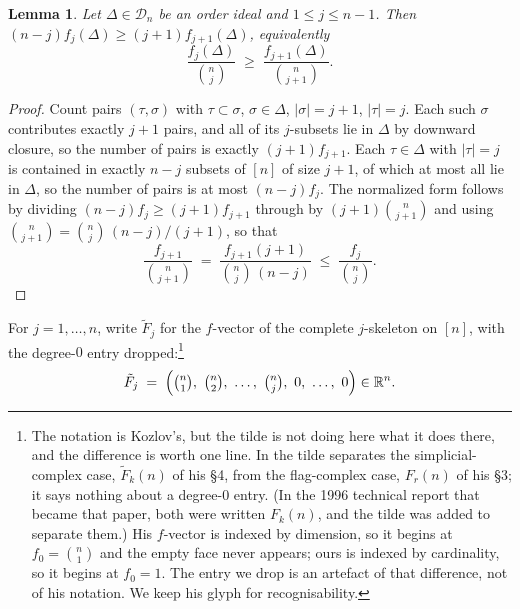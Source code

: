 \documentclass[11pt, a4paper, abstract=yes]{scrartcl}
\theoremstyle{definition}
\theoremstyle{remark}
\theoremstyle{plain}
\newtheorem{lemma}[definition]{Lemma}
\newcommand{\leandiscof}[1]{\tikz[baseline=-0.6ex]\fill[#1] (0,0) circle (0.6ex);}
\newcommand{\leanfull}{\leandiscof{leanfull}}
\newcommand{\leanmark}[1]{\leavevmode{\reversemarginpar\marginnote{\raggedleft#1}}}
\begin{document}
\begin{lemma}
\leanmark{\leanfull}Let \(\Delta\in\mathcal D_n\) be an order ideal and \(1\le j\le n-1\). Then
\((n-j)f_j(\Delta)\ge(j+1)f_{j+1}(\Delta)\), equivalently
\begin{equation}\label{eq:lym}
  \frac{f_j(\Delta)}{\binom nj}\;\ge\;\frac{f_{j+1}(\Delta)}{\binom n{j+1}}.
\end{equation}
\label{lem:lym}
\label{lem-lym}
\end{lemma}

\begin{proof}
Count pairs \((\tau,\sigma)\) with \(\tau\subset\sigma\), \(\sigma\in\Delta\), \(|\sigma|=j+1\),
\(|\tau|=j\). Each such \(\sigma\) contributes exactly \(j+1\) pairs, and all of its \(j\)-subsets
lie in \(\Delta\) by downward closure, so the number of pairs is exactly \((j+1)f_{j+1}\). Each
\(\tau\in\Delta\) with \(|\tau|=j\) is contained in exactly \(n-j\) subsets of \([n]\) of size
\(j+1\), of which at most all lie in \(\Delta\), so the number of pairs is at most \((n-j)f_j\). The
normalized form follows by dividing \((n-j)f_j\ge(j+1)f_{j+1}\) through by
\((j+1)\binom n{j+1}\) and using \(\binom n{j+1}=\binom nj\,(n-j)/(j+1)\), so that
\begin{equation}\label{eq:lym-2}
  \frac{f_{j+1}}{\binom n{j+1}}\;=\;\frac{f_{j+1}(j+1)}{\binom nj\,(n-j)}
  \;\le\;\frac{f_j}{\binom nj}.
\end{equation}
\end{proof}

For \(j=1,\dots,n\), write \(\tilde F_j\) for the \(f\)-vector of the complete \(j\)-skeleton on
\([n]\), with the degree-\(0\) entry dropped:\footnote{The notation is Kozlov's, but the
tilde is not doing here what it does there, and the difference is worth one line. In
\cite{Kozlov1997} the tilde separates the simplicial-complex case, \(\tilde F_k(n)\) of his
\S4, from the flag-complex case, \(F_r(n)\) of his \S3; it says nothing about a degree-\(0\)
entry. (In the 1996 technical report that became that paper, both were written \(F_k(n)\), and
the tilde was added to separate them.) His \(f\)-vector is indexed by dimension, so it begins at
\(f_0=\binom n1\) and the empty face never appears; ours is indexed by cardinality, so it begins
at \(f_0=1\). The entry we drop is an artefact of that difference, not of his notation. We keep
his glyph for recognisability.}
\begin{equation}\label{eq:skeleton}
  \tilde F_j\;=\;\Bigl(\tbinom n1,\ \tbinom n2,\ \dots,\ \tbinom nj,\ 0,\ \dots,\ 0\Bigr)\in\mathbb R^n .
\end{equation}
\end{document}
